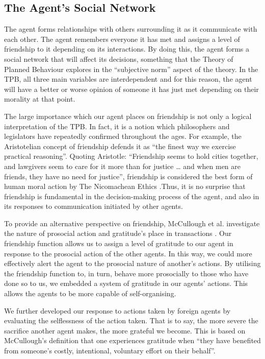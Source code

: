 \subsection{The Agent’s Social Network}
The agent forms relationships with others surrounding it as it communicate with each other. The agent remembers everyone it has met and assigns a level of friendship to it depending on its interactions. By doing this, the agent forms a social network that will affect its decisions, something that the Theory of Planned Behaviour explores in the “subjective norm” aspect of the theory. In the TPB,  all three main variables are interdependent and for this reason, the agent will have a better or worse opinion of someone it has just met depending on their morality at that point. \par
The large importance which our agent places on friendship is not only a logical interpretation of the TPB. In fact, it is a notion which philosophers and legislators have repeatedly confirmed throughout the ages. For example, the Aristotelian concept of friendship defends it as “the finest way we exercise practical reasoning”. Quoting Aristotle: “Friendship seems to hold cities together, and lawgivers seem to care for it more than for justice … and when men are friends, they have no need for justice”, friendship is considered the best form of human moral action by The Nicomachean Ethics \cite{sokolowski}.Thus, it is no surprise that friendship is fundamental in the decision-making process of the agent, and also in its responses to communication initiated by other agents. \par 
To provide an alternative perspective on friendship, McCullough et al. investigate the nature of prosocial action and gratitude’s place in transactions \cite{doi:10.1111/j.1467-8721.2008.00590.x}. Our friendship function allows us to assign a level of gratitude to our agent in response to the prosocial action of the other agents. In this way, we could more effectively alert the agent to the prosocial nature of another’s actions. By utilising the friendship function to, in turn, behave more prosocially to those who have done so to us, we embedded a system of gratitude in our agents’ actions. This allows the agents to be more capable of self-organising.\par 
We further developed our response to actions taken by foreign agents by evaluating the selflessness of the action taken. That is to say, the more severe the sacrifice another agent makes, the more grateful we become. This is based on McCullough’s definition that one experiences gratitude when “they have benefited from someone’s costly, intentional, voluntary effort on their behalf”. \par 
